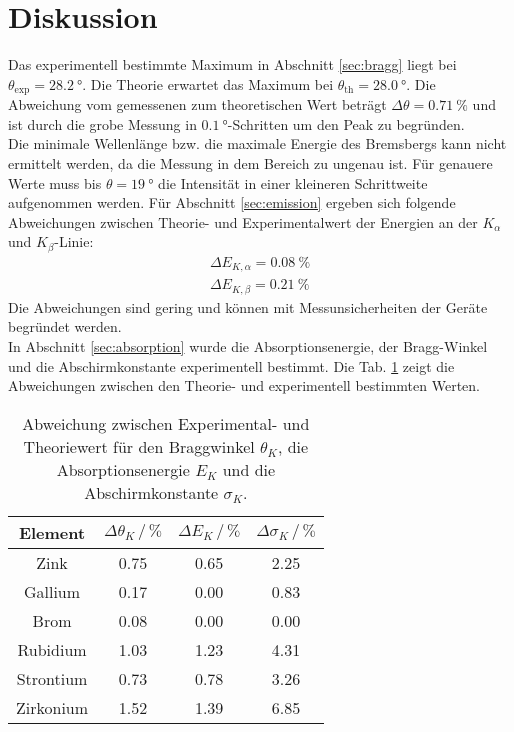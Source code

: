 \section{Diskussion}
\label{sec:Diskussion}

Das experimentell bestimmte Maximum in Abschnitt \ref{sec:bragg} liegt bei $\theta_\text{exp} = \SI{28.2}{\degree}$.
Die Theorie erwartet das Maximum bei $\theta_\text{th} = \SI{28.0}{\degree}$.
Die Abweichung vom gemessenen zum theoretischen Wert beträgt $\Delta \theta = \SI{0.71}{\percent}$ und ist durch die grobe Messung in $\SI{0.1}{\degree}$-Schritten um den Peak zu begründen.
\\
Die minimale Wellenlänge bzw. die maximale Energie des Bremsbergs kann nicht ermittelt werden, da die Messung in dem Bereich zu ungenau ist.
Für genauere Werte muss bis $\theta = \SI{19}{\degree}$ die Intensität in einer kleineren Schrittweite aufgenommen werden.
Für Abschnitt \ref{sec:emission} ergeben sich folgende Abweichungen zwischen Theorie- und Experimentalwert der Energien an der $K_\alpha$ und $K_\beta$-Linie: 
\begin{align*}
    \Delta E_{K,\alpha} = \SI{0.08}{\percent} \\
    \Delta E_{K,\beta} = \SI{0.21}{\percent}
\end{align*}
Die Abweichungen sind gering und können mit Messunsicherheiten der Geräte begründet werden.
\\
In Abschnitt \ref{sec:absorption} wurde die Absorptionsenergie, der Bragg-Winkel und die Abschirmkonstante experimentell bestimmt.
Die Tab. \ref{tab:vgl_elemente} zeigt die Abweichungen zwischen den Theorie- und experimentell bestimmten Werten.
\begin{table}
    \centering
    \begin{tabular}{c|ccc}
        \toprule
        Element & $\Delta \theta_K \,/\, \si{\percent}$ & $\Delta E_K \,/\, \si{\percent}$ & $\Delta \sigma_K \,/\, \si{\percent}$ \\
        \midrule
        Zink & 0.75 & 0.65 & 2.25 \\
        Gallium & 0.17 & 0.00 & 0.83 \\
        Brom & 0.08 & 0.00 & 0.00 \\
        Rubidium & 1.03 & 1.23 & 4.31 \\
        Strontium & 0.73 & 0.78 & 3.26 \\
        Zirkonium & 1.52 & 1.39 & 6.85 \\
        \bottomrule
    \end{tabular}
    \caption{Abweichung zwischen Experimental- und Theoriewert \cite{k_kante} für den Braggwinkel $\theta_K$, die Absorptionsenergie $E_K$ und die Abschirmkonstante $\sigma_K$.}
    \label{tab:vgl_elemente}
\end{table}
